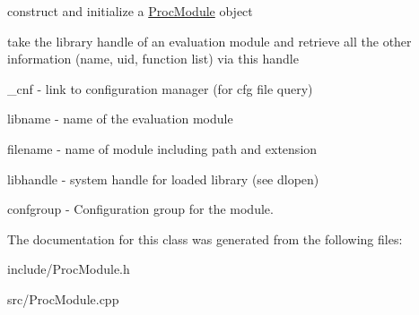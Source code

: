 construct and initialize a \hyperlink{classProcModule}{Proc\+Module} object 

take the library handle of an evaluation module and retrieve all the other information (name, uid, function list) via this handle

\begin{DoxyItemize}
\item {\ttfamily \+\_\+cnf} -\/ link to configuration manager (for cfg file query) \item {\ttfamily libname} -\/ name of the evaluation module \item {\ttfamily filename} -\/ name of module including path and extension \item {\ttfamily libhandle} -\/ system handle for loaded library (see dlopen) \item {\ttfamily confgroup} -\/ Configuration group for the module. \end{DoxyItemize}


The documentation for this class was generated from the following files\+:\begin{DoxyCompactItemize}
\item 
include/Proc\+Module.\+h\item 
src/Proc\+Module.\+cpp\end{DoxyCompactItemize}
